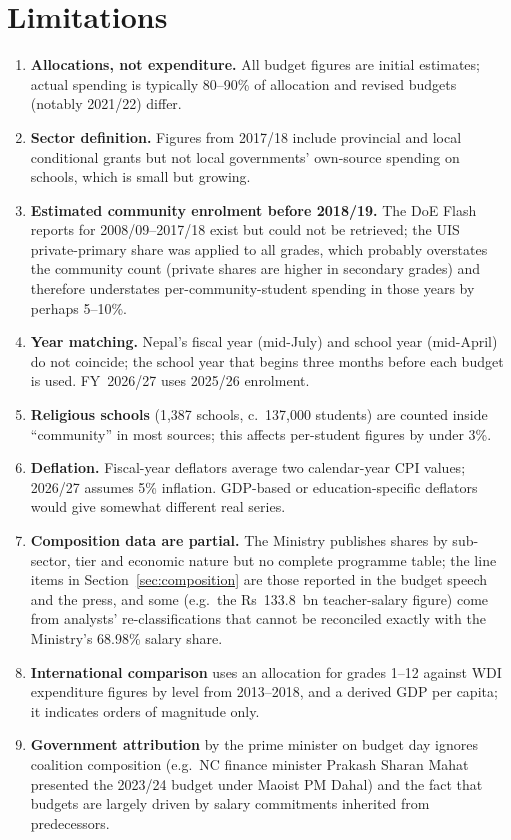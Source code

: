 \documentclass[11pt,a4paper]{article}
\begin{document}
\section{Limitations}
\begin{enumerate}[leftmargin=1.4em]
\item \textbf{Allocations, not expenditure.} All budget figures are initial estimates; actual spending is typically 80--90\% of allocation and revised budgets (notably 2021/22) differ.
\item \textbf{Sector definition.} Figures from 2017/18 include provincial and local conditional grants but not local governments' own-source spending on schools, which is small but growing.
\item \textbf{Estimated community enrolment before 2018/19.} The DoE Flash reports for 2008/09--2017/18 exist but could not be retrieved; the UIS private-primary share was applied to all grades, which probably overstates the community count (private shares are higher in secondary grades) and therefore understates per-community-student spending in those years by perhaps 5--10\%.
\item \textbf{Year matching.} Nepal's fiscal year (mid-July) and school year (mid-April) do not coincide; the school year that begins three months before each budget is used. FY~2026/27 uses 2025/26 enrolment.
\item \textbf{Religious schools} (1,387 schools, c.\ 137,000 students) are counted inside ``community'' in most sources; this affects per-student figures by under 3\%.
\item \textbf{Deflation.} Fiscal-year deflators average two calendar-year CPI values; 2026/27 assumes 5\% inflation. GDP-based or education-specific deflators would give somewhat different real series.
\item \textbf{Composition data are partial.} The Ministry publishes shares by sub-sector, tier and economic nature but no complete programme table; the line items in Section~\ref{sec:composition} are those reported in the budget speech and the press, and some (e.g.\ the Rs~133.8~bn teacher-salary figure) come from analysts' re-classifications that cannot be reconciled exactly with the Ministry's 68.98\% salary share.
\item \textbf{International comparison} uses an allocation for grades 1--12 against WDI expenditure figures by level from 2013--2018, and a derived GDP per capita; it indicates orders of magnitude only.
\item \textbf{Government attribution} by the prime minister on budget day ignores coalition composition (e.g.\ NC finance minister Prakash Sharan Mahat presented the 2023/24 budget under Maoist PM Dahal) and the fact that budgets are largely driven by salary commitments inherited from predecessors.
\end{enumerate}


\renewcommand{\bibfont}{\small}

\end{document}
